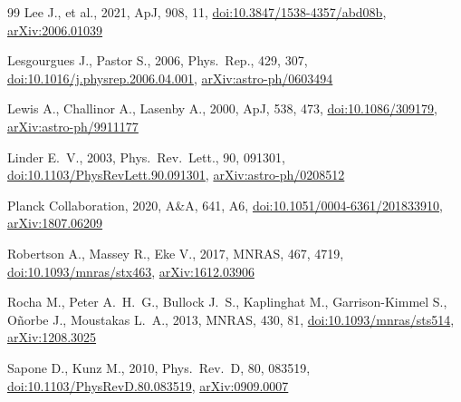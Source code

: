 \documentclass[fleqn,usenatbib]{mnras}
\begin{document}
\begin{thebibliography}{99}
Lee J., et al., 2021, ApJ, 908, 11,
\href{https://doi.org/10.3847/1538-4357/abd08b}{doi:10.3847/1538-4357/abd08b},
\href{https://arxiv.org/abs/2006.01039}{arXiv:2006.01039}

Lesgourgues J., Pastor S., 2006, Phys.\ Rep., 429, 307,
\href{https://doi.org/10.1016/j.physrep.2006.04.001}{doi:10.1016/j.physrep.2006.04.001},
\href{https://arxiv.org/abs/astro-ph/0603494}{arXiv:astro-ph/0603494}

Lewis A., Challinor A., Lasenby A., 2000, ApJ, 538, 473,
\href{https://doi.org/10.1086/309179}{doi:10.1086/309179},
\href{https://arxiv.org/abs/astro-ph/9911177}{arXiv:astro-ph/9911177}

Linder E.~V., 2003, Phys.\ Rev.\ Lett., 90, 091301,
\href{https://doi.org/10.1103/PhysRevLett.90.091301}{doi:10.1103/PhysRevLett.90.091301},
\href{https://arxiv.org/abs/astro-ph/0208512}{arXiv:astro-ph/0208512}

{Planck Collaboration}, 2020, A\&A, 641, A6,
\href{https://doi.org/10.1051/0004-6361/201833910}{doi:10.1051/0004-6361/201833910},
\href{https://arxiv.org/abs/1807.06209}{arXiv:1807.06209}

Robertson A., Massey R., Eke V., 2017, MNRAS, 467, 4719,
\href{https://doi.org/10.1093/mnras/stx463}{doi:10.1093/mnras/stx463},
\href{https://arxiv.org/abs/1612.03906}{arXiv:1612.03906}

Rocha M., Peter A.~H.~G., Bullock J.~S., Kaplinghat M., Garrison-Kimmel S., O{\~n}orbe J., Moustakas L.~A., 2013, MNRAS, 430, 81,
\href{https://doi.org/10.1093/mnras/sts514}{doi:10.1093/mnras/sts514},
\href{https://arxiv.org/abs/1208.3025}{arXiv:1208.3025}

Sapone D., Kunz M., 2010, Phys.\ Rev.\ D, 80, 083519,
\href{https://doi.org/10.1103/PhysRevD.80.083519}{doi:10.1103/PhysRevD.80.083519},
\href{https://arxiv.org/abs/0909.0007}{arXiv:0909.0007}


\end{thebibliography}
\end{document}
